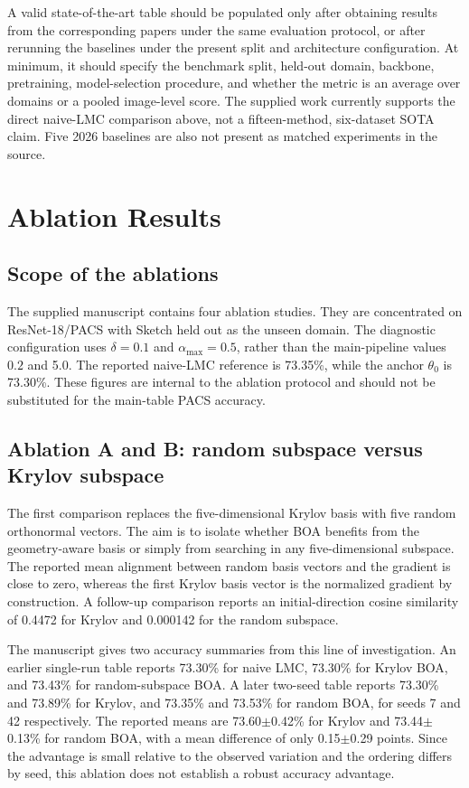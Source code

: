 \documentclass[11pt,a4paper]{article}
\begin{document}
A valid state-of-the-art table should be populated only after obtaining results from the corresponding papers under the same evaluation protocol, or after rerunning the baselines under the present split and architecture configuration. At minimum, it should specify the benchmark split, held-out domain, backbone, pretraining, model-selection procedure, and whether the metric is an average over domains or a pooled image-level score. The supplied work currently supports the direct naive-LMC comparison above, not a fifteen-method, six-dataset SOTA claim. Five 2026 baselines are also not present as matched experiments in the source.

\section{Ablation Results}

\subsection{Scope of the ablations}
The supplied manuscript contains four ablation studies. They are concentrated on ResNet-18/PACS with Sketch held out as the unseen domain. The diagnostic configuration uses $\delta=0.1$ and $\alpha_{\max}=0.5$, rather than the main-pipeline values $0.2$ and 5.0. The reported naive-LMC reference is 73.35\%, while the anchor $\theta_0$ is 73.30\%. These figures are internal to the ablation protocol and should not be substituted for the main-table PACS accuracy.

\subsection{Ablation A and B: random subspace versus Krylov subspace}
The first comparison replaces the five-dimensional Krylov basis with five random orthonormal vectors. The aim is to isolate whether BOA benefits from the geometry-aware basis or simply from searching in any five-dimensional subspace. The reported mean alignment between random basis vectors and the gradient is close to zero, whereas the first Krylov basis vector is the normalized gradient by construction. A follow-up comparison reports an initial-direction cosine similarity of 0.4472 for Krylov and 0.000142 for the random subspace.

The manuscript gives two accuracy summaries from this line of investigation. An earlier single-run table reports 73.30\% for naive LMC, 73.30\% for Krylov BOA, and 73.43\% for random-subspace BOA. A later two-seed table reports 73.30\% and 73.89\% for Krylov, and 73.35\% and 73.53\% for random BOA, for seeds 7 and 42 respectively. The reported means are 73.60$\pm$0.42\% for Krylov and 73.44$\pm$0.13\% for random BOA, with a mean difference of only 0.15$\pm$0.29 points. Since the advantage is small relative to the observed variation and the ordering differs by seed, this ablation does not establish a robust accuracy advantage.
\end{document}
